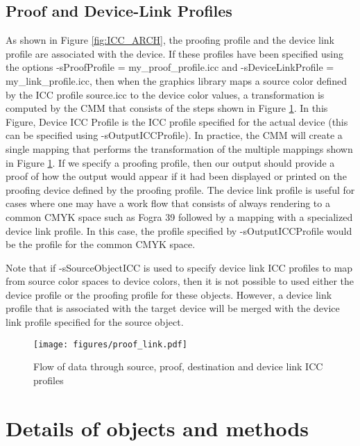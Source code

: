 \documentclass[12pt,notitlepage]{article}
\begin{document}
\subsection{Proof and Device-Link Profiles}
\label{sec:proof_link}

As shown in Figure \ref{fig:ICC_ARCH}, the proofing profile and the device link profile are associated with the device.  If these profiles have been specified using the options
-sProofProfile = my\_proof\_profile.icc and -sDeviceLinkProfile = my\_link\_profile.icc, then when the graphics library maps a source color defined by the ICC profile source.icc to the device color values, a transformation is computed by the CMM that consists of the steps shown in Figure \ref{fig:proof_link}. In this Figure, Device ICC Profile is the ICC profile specified for the actual device (this can be specified using -sOutputICCProfile).  In practice, the CMM will create a single mapping that performs the transformation of the multiple mappings shown in Figure \ref{fig:proof_link}.  If we specify a proofing profile, then our output should provide a proof of how the output would appear if it had been displayed or printed on the proofing device defined by the proofing profile.  The device link profile is useful for cases where one may have a work flow that consists of always rendering to a common CMYK space such as Fogra 39 followed by a mapping with a specialized device link profile.  In this case, the profile specified by -sOutputICCProfile would be the profile for the common CMYK space.

Note that if -sSourceObjectICC is used to specify device link ICC profiles to map from source color spaces to device colors, then it is not possible to used either the device profile or the proofing profile for these objects.  However, a device link profile that is associated with the target device will be merged with the device link profile specified for the source object.

\begin{figure}
    \begin{center}
\texttt{[image: figures/proof\_link.pdf]}
    \end{center}
   \caption{Flow of data through source, proof, destination and device link ICC profiles}
   \label{fig:proof_link}
\end{figure}

\section{Details of objects and methods}
\end{document}

